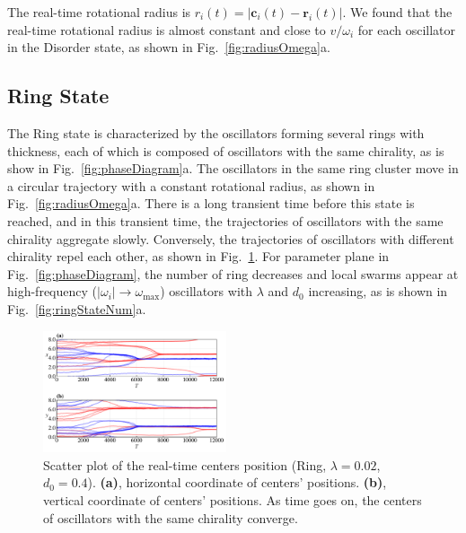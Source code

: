 \documentclass[%
 aip,
 amsmath,amssymb,
 reprint,%
]{revtex4-1}
\begin{document}
The real-time rotational radius is $r_i(t)=\left| \mathbf{c}_i(t)-\mathbf{r}_i(t) \right|$. We found that the real-time rotational radius is almost constant and close to $v/\omega_i$ for each oscillator in the Disorder state, as shown in Fig.~\ref{fig:radiusOmega}a.





\subsection{Ring State}

The Ring state is characterized by the oscillators forming several rings with thickness, each of which is composed of oscillators with the same chirality, as is show in Fig.~\ref{fig:phaseDiagram}a. The oscillators in the same ring cluster move in a circular trajectory with a constant rotational radius, as shown in Fig.~\ref{fig:radiusOmega}a. 
There is a long transient time before this state is reached, and in this transient time, the trajectories of oscillators with the same chirality aggregate slowly. Conversely, the trajectories of oscillators with different chirality repel each other, as shown in Fig.~\ref{fig:ringStateCenters}. For parameter plane in Fig.~\ref{fig:phaseDiagram}, the number of ring decreases and local swarms appear at high-frequency ($\left|\omega_i\right|\rightarrow \omega_{\max}$) oscillators with $\lambda$ and $d_0$ increasing, as is shown in Fig.~\ref{fig:ringStateNum}a. 


\begin{figure}
    \includegraphics[width=0.48\textwidth]{./figs/ringStateCenters.pdf}
    \caption{
        \label{fig:ringStateCenters} Scatter plot of the real-time centers position (Ring, $\lambda=0.02$, $d_0=0.4$). 
        \textbf{(a)}, horizontal coordinate of centers' positions.
        \textbf{(b)}, vertical coordinate of centers' positions. As time goes on, the centers of oscillators with the same chirality converge.
    }
\end{figure}
\end{document}
